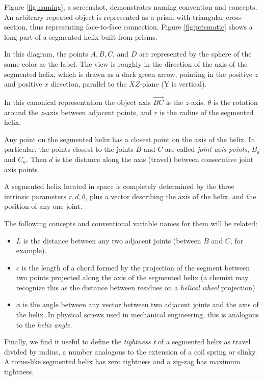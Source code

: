 \documentclass{svproc}
\begin{document}
Figure \ref{fig:naming}, a screenshot, demonstrates naming convention and concepts.
An arbitrary repeated object is represented as a prism
with triangular cross-section,
thus representing face-to-face connection. Figure \ref{fig:prismatic} shows a long part of a segmented helix
built from prisms.

In this diagram, the
points $A,B,C$, and $D$ are represented by the sphere of the same color as the label. The view is roughly in the direction of
the axis of the segmented helix, which is drawn as a dark green arrow, pointing in the positive $z$ and positive $x$ direction,
parallel to the $XZ$-plane (Y is vertical).

In this canonical representation the object axis $\overrightarrow{BC}$ is
the $z$-axis.
$\theta$ is the rotation around the $z$-axis
between adjacent points, and
$r$ is the radius of the segmented helix.

Any point on the segmented helix has a closest point on the axis of the helix.
In particular, the points closest to the
joints $B$ and $C$ are called {\em joint axis points}, $B_a$ and $C_a$.
Then $d$ is the distance along the axis (travel) between consecutive joint axis points.

A segmented helix located in space is completely determined by
the three intrinsic parameters $r,d,\theta$, plus
a vector describing the axis
of the helix, and the position of any one joint.

The following concepts and conventional variable names for them will be related:
\begin{itemize}
\item $L$ is the distance between any two adjacent joints (between $B$ and $C$, for example).
  \item $c$ is the length of a chord formed by the projection of the segment between two points projected along the axis of the segmented helix (a chemist may recognize this as the distance between residues on a {\em helical wheel} projection).
\item $\phi$ is the angle between any vector between two adjacent joints and the axis of the helix. In physical screws used in mechanical engineering, this is analogous to the {\em helix angle}.
  \end{itemize}
Finally, we find it useful to define the {\em tightness t} of a segmented helix
as travel divided by radius, a number
analogous to the extension of a coil spring or slinky.
A torus-like segmented helix has zero tightness and a zig-zag has
maximum tightness.
\end{document}
